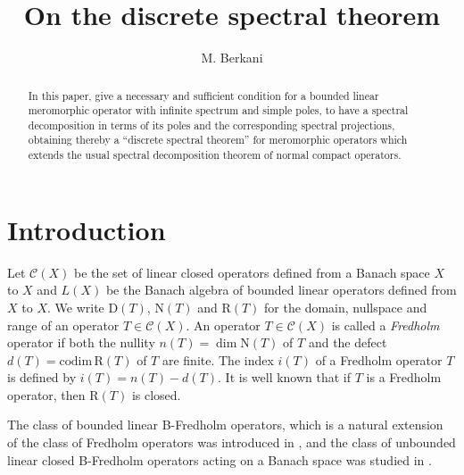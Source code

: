 \documentclass[11pt]{article}
\numberwithin{equation}{section} \allowdisplaybreaks
\newcommand{\nul}[1]{\mathrm{N}( {#1} )}
\newcommand{\ran}[1]{\mathrm{R}({#1})}
\newcommand{\codim}{\mathrm{codim \,}}
\newcommand{\ch}{{ \mathcal C}(X)}
\begin{document}
\title {  On the discrete spectral theorem }

\author { M. Berkani }


\date{}

\maketitle


\begin{abstract}




{\tiny In this paper,
 give a necessary and sufficient condition for a   bounded linear
meromorphic operator with infinite spectrum and simple poles, to
have a  spectral decomposition in terms of its poles and the
corresponding spectral projections, obtaining thereby  a
``discrete spectral theorem'' for  meromorphic operators which
extends the usual spectral decomposition theorem of normal compact
operators.}

\end{abstract}

\renewcommand{\thefootnote}{}


\tableofcontents





\section{Introduction}

   Let $\ch$ be  the  set of  linear closed operators defined
from a Banach space  $X$ to $X$ and $L(X)$ be the Banach algebra
of  bounded linear  operators defined from   $X$ to $X.$ We write
${\mathrm D}(T)$, $\nul{T}$ and $\ran{T}$ for the domain,
nullspace and range of an operator $T\in \ch$. An operator $T\in
\ch$  is called a {\it Fredholm}  operator \cite{TLY} if both the
nullity  $n(T)=\dim \nul{T}$ of $T$ and the defect $d(T)=\codim
\ran{T}$  of $T$  are finite. The index $i(T)$ of a Fredholm
operator $T$ is defined by $i(T)=n(T)-d(T)$. It is well known that
if $T$ is a Fredholm operator, then $\ran{T}$ is closed.

The class of bounded linear  B-Fredholm operators, which is a
natural extension of the class of Fredholm operators  was
introduced in \cite{P7}, and the class of unbounded linear closed
B-Fredholm operators acting on a Banach space was studied in
\cite{P33}.
\end{document}
